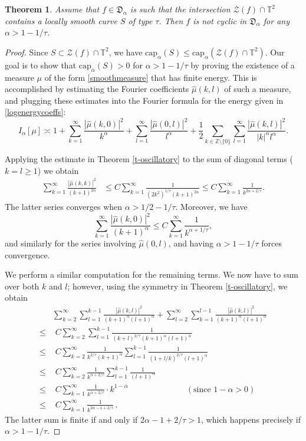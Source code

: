 \documentclass[11 pt,reqno]{amsart}
\newtheorem{thm}{Theorem}[section]
\theoremstyle{definition}
\theoremstyle{remark}
\numberwithin{equation}{section} \numberwithin{figure}{section}
\begin{document}
\begin{thm}\label{t-result}
Assume that $f\in\mathfrak{D}_\alpha$ is such that the intersection $\mathcal{Z}(f) \cap\mathbb{T}^2$ contains a locally smooth curve $S$ of type $\tau$. Then $f$ is not cyclic in $\mathfrak{D}_\alpha$ for any $\alpha>1-1/\tau$.
\end{thm}
\begin{proof}
Since $S\subset \mathcal{Z}(f)\cap\mathbb{T}^2$, we have ${\text{cap}_\alpha}(S)\le {\text{cap}_\alpha}(\mathcal{Z}(f)\cap\mathbb{T}^2)$.
Our goal is to show that ${\text{cap}_\alpha}(S)>0$ for $\alpha>1-1/\tau$ by proving the existence of a measure $\mu$ of the form \eqref{smoothmeasure} that has finite energy. This is accomplished by estimating the Fourier coefficients $\hat\mu(k,l)$ of such a measure, and plugging these estimates into the Fourier formula for the energy given in \eqref{logenergycoeffs}:
\begin{equation*}
I_{\alpha}[\mu]\asymp 1+\sum_{k=1}^{\infty}\frac{|\hat{\mu}(k,0)|^2}{k^{\alpha}}
+\sum_{l=1}^{\infty}\frac{|\hat{\mu}(0,l)|^2}{l^{\alpha}}+\frac{1}{2}\sum_{k \in \mathbb{Z}\setminus \{0\}}
\sum_{l=1}^{\infty}\frac{|\hat{\mu}(k,l)|^2}{|k|^{\alpha} l^{\alpha}}.
\end{equation*}

Applying the estimate in Theorem \ref{t-oscillatory} to the sum of diagonal terms ($k=l\ge 1$) we obtain
\begin{align*}
\sum_{k=1}^\infty \frac{|\hat\mu(k,k)|^2}{(k+1)^{2\alpha}}
&\le C
\sum_{k=1}^\infty \frac{1}{(2k^2)^{1/\tau}(k+1)^{2\alpha}}
\le C
\sum_{k=1}^\infty \frac{1}{k^{2\alpha+2/\tau}}.
\end{align*}
The latter series converges when $\alpha> 1/2 - 1/\tau$. Moreover, we have
\[\sum_{k=1}^{\infty}\frac{|\hat{\mu}(k,0)|^2}{(k+1)^{\alpha}}\leq C\sum_{k=1}^{\infty}\frac{1}{k^{\alpha+1/\tau}},\]
and similarly for the series involving $\hat{\mu}(0,l)$, and having $\alpha>1-1/\tau$ forces convergence.

We perform a similar computation for the remaining terms. We now have to sum over both $k$ and $l$; however, using the symmetry in Theorem \ref{t-oscillatory}, we obtain
\begin{align*}
&\sum_{k=2}^\infty\sum_{l=1}^{k-1} \frac{|\hat\mu(k,l)|^2}{(k+1)^{\alpha}(l+1)^{\alpha}}
+\sum_{l=2}^\infty\sum_{k=1}^{l-1} \frac{|\hat\mu(k,l)|^2}{(k+1)^{\alpha}(l+1)^{\alpha}}\\
\le
&\,\,C
\sum_{k=2}^\infty\sum_{l=1}^{k-1} \frac{1}{(k+l)^{2/\tau}(k+1)^{\alpha}(l+1)^{\alpha}}\\
\le
&\,\,C
\sum_{k=2}^\infty \frac{1}{k^{2/\tau}(k+1)^{\alpha}}\sum_{l=1}^{k-1} \frac{1}{(1+l/k)^{2/\tau}(l+1)^{\alpha}}\\
\le
&\,\,C
\sum_{k=2}^\infty \frac{1}{k^{\alpha+2/\tau}}\sum_{l=1}^{k-1} \frac{1}{(l+1)^{\alpha}}\\
\le
&\,\,C
\sum_{k=1}^\infty \frac{1}{k^{\alpha+2/\tau}}\cdot k^{1-\alpha}\qquad\qquad\qquad\quad(\text{since }1-\alpha>0)\\
\le
&\,\,C
\sum_{k=1}^\infty \frac{1}{k^{2\alpha-1+2/\tau}}\,.
\end{align*}
The latter sum is finite if and only if $2\alpha-1+2/\tau>1$, which happens precisely if $\alpha>1-1/\tau$.


\end{proof}
\end{document}
